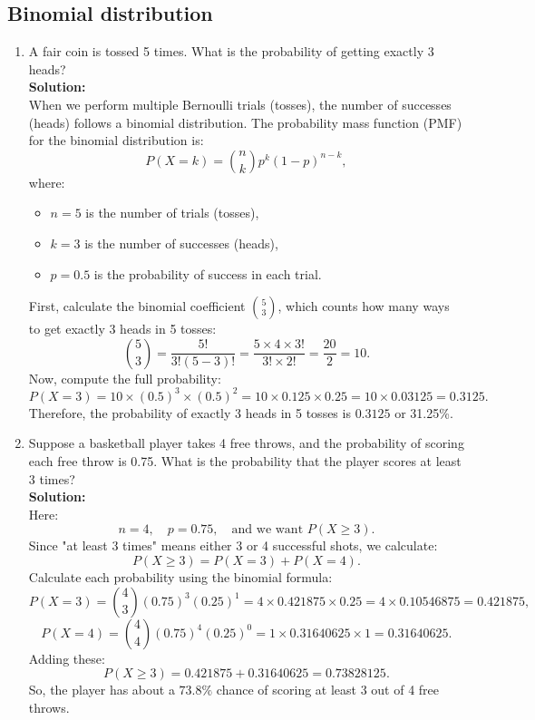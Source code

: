 \documentclass{book}
\begin{document}
\subsection*{Binomial distribution}

\begin{enumerate}

    \item A fair coin is tossed 5 times. What is the probability of getting exactly 3 heads? \\
    
    \textbf{Solution:} \\
    
    When we perform multiple Bernoulli trials (tosses), the number of successes (heads) follows a binomial distribution. The probability mass function (PMF) for the binomial distribution is:
    \[
    P(X = k) = \binom{n}{k} p^k (1-p)^{n-k},
    \]
    where:
    \begin{itemize}
        \item \(n = 5\) is the number of trials (tosses),
        \item \(k = 3\) is the number of successes (heads),
        \item \(p = 0.5\) is the probability of success in each trial.
    \end{itemize}
    First, calculate the binomial coefficient \(\binom{5}{3}\), which counts how many ways to get exactly 3 heads in 5 tosses:
    \[
    \binom{5}{3} = \frac{5!}{3! (5-3)!} = \frac{5 \times 4 \times 3!}{3! \times 2!} = \frac{20}{2} = 10.
    \]
    Now, compute the full probability:
    \[
    P(X=3) = 10 \times (0.5)^3 \times (0.5)^2 = 10 \times 0.125 \times 0.25 = 10 \times 0.03125 = 0.3125.
    \]
    Therefore, the probability of exactly 3 heads in 5 tosses is \(\boxed{0.3125}\) or 31.25\%.

    \item Suppose a basketball player takes 4 free throws, and the probability of scoring each free throw is 0.75. What is the probability that the player scores at least 3 times? \\
    
    \textbf{Solution:} \\
    
    Here:
    \[
    n = 4, \quad p = 0.75, \quad \text{and we want } P(X \geq 3).
    \]
    Since "at least 3 times" means either 3 or 4 successful shots, we calculate:
    \[
    P(X \geq 3) = P(X=3) + P(X=4).
    \]
    Calculate each probability using the binomial formula:
    \[
    P(X=3) = \binom{4}{3} (0.75)^3 (0.25)^1 = 4 \times 0.421875 \times 0.25 = 4 \times 0.10546875 = 0.421875,
    \]
    \[
    P(X=4) = \binom{4}{4} (0.75)^4 (0.25)^0 = 1 \times 0.31640625 \times 1 = 0.31640625.
    \]
    Adding these:
    \[
    P(X \geq 3) = 0.421875 + 0.31640625 = 0.73828125.
    \]
    So, the player has about a \(\boxed{73.8\%}\) chance of scoring at least 3 out of 4 free throws.


\end{enumerate}
\end{document}
